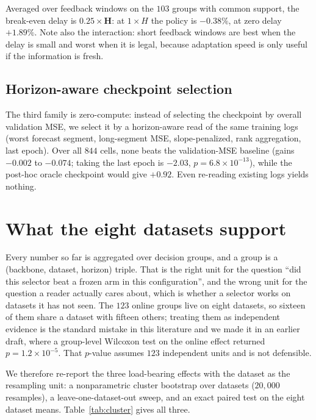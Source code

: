 \documentclass[a4paper,fleqn]{cas-sc}
\begin{document}
Averaged over feedback windows on the $103$ groups with common support, the
break-even delay is $\mathbf{0.25\times H}$: at $1\times H$ the policy is
$-0.38\%$, at zero delay $+1.89\%$. Note also the interaction: short feedback
windows are best when the delay is small and worst when it is legal, because
adaptation speed is only useful if the information is fresh.

\subsection{Horizon-aware checkpoint selection}
The third family is zero-compute: instead of selecting the checkpoint by overall
validation MSE, we select it by a horizon-aware read of the same training logs
(worst forecast segment, long-segment MSE, slope-penalized, rank aggregation,
last epoch). Over all $844$ cells, none beats the validation-MSE baseline
(gains $-0.002$ to $-0.074$; taking the last epoch is $-2.03$,
$p{=}6.8\!\times\!10^{-13}$), while the post-hoc oracle checkpoint would give
$+0.92$. Even re-reading existing logs yields nothing.

\section{What the eight datasets support}
\label{sec:cluster}

Every number so far is aggregated over decision groups, and a group is a
(backbone, dataset, horizon) triple. That is the right unit for the question
``did this selector beat a frozen arm in this configuration'', and the wrong unit
for the question a reader actually cares about, which is whether a selector works
on datasets it has not seen. The $123$ online groups live on eight datasets, so
sixteen of them share a dataset with fifteen others; treating them as independent
evidence is the standard mistake in this literature and we made it in an earlier
draft, where a group-level Wilcoxon test on the online effect returned
$p = 1.2\!\times\!10^{-5}$. That $p$-value assumes $123$ independent units and is
not defensible.

We therefore re-report the three load-bearing effects with the dataset as the
resampling unit: a nonparametric cluster bootstrap over datasets
($20{,}000$ resamples), a leave-one-dataset-out sweep, and an exact paired test on
the eight dataset means. Table~\ref{tab:cluster} gives all three.
\end{document}
